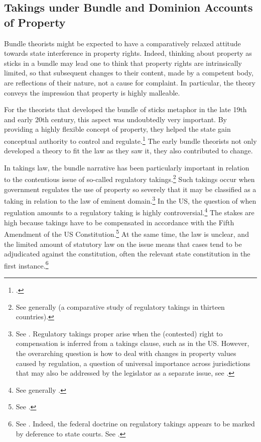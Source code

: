 \subsection{Takings under Bundle and Dominion Accounts of Property}\label{sec:2:3:1}

Bundle theorists might be expected to have a comparatively relaxed attitude towards state interference in property rights. Indeed, thinking about property as sticks in a bundle may lead one to think that property rights are intrinsically limited, so that subsequent changes to their content, made by a competent body, are reflections of their nature, not a cause for complaint. In particular, the theory conveys the impression that property is highly malleable. 

For the theorists that developed the bundle of sticks metaphor in the late 19th and early 20th century, this aspect was undoubtedly very important. By providing a highly flexible concept of property, they helped the state gain conceptual authority to control and regulate.\footcite[195]{klein11} The early bundle theorists not only developed a theory to fit the law as they saw it, they also contributed to change.

In takings law, the bundle narrative has been particularly important in relation to the contentious issue of so-called regulatory takings.\footnote{See generally \cite{alterman10} (a comparative study of   regulatory takings in thirteen countries).} Such takings occur when government regulates the use of property so severely that it may be classified as a taking in relation to the law of eminent domain.\footnote{See \cite[1]{fischel95}. Regulatory takings proper arise when the (contested) right to compensation is inferred from a takings clause, such as in the US. However, the overarching question is how to deal with changes in property values caused by regulation, a question of universal importance across jurisdictions that may also be addressed by the legislator as a separate issue, see \cite[3-10]{alterman10}.} In the US, the question of when regulation amounts to a regulatory taking is highly controversial.\footnote{See generally \cite{fischel95}.} The stakes are high because takings have to be compensated in accordance with the Fifth Amendment of the US Constitution.\footnote{See \cite{fifth}.} At the same time, the law is unclear, and the limited amount of statutory law on the issue means that cases tend to be adjudicated against the constitution, often the relevant state constitution in the first instance.\footnote{See \cite[31-32]{alterman10}. Indeed, the federal doctrine on regulatory takings appears to be marked by deference to state courts. See \cite[66]{fischel95}.}

